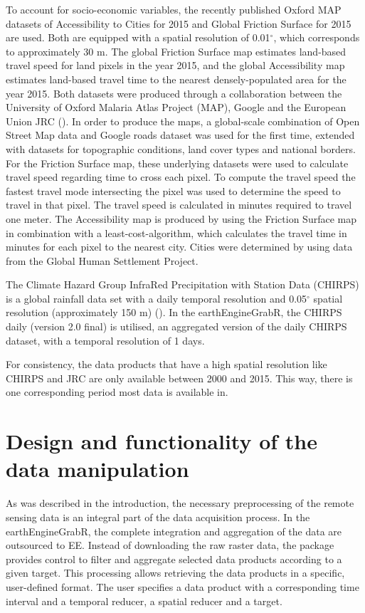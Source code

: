 To account for socio-economic variables, the recently published Oxford MAP datasets of Accessibility to Cities for 2015 and Global Friction Surface for 2015 are used. Both are equipped with a spatial resolution of 0.01$^\circ$, which corresponds to approximately 30 m. The global Friction Surface map estimates land-based travel speed for land pixels in the year 2015, and the global Accessibility map estimates land-based travel time to the nearest densely-populated area for the year 2015. Both datasets were produced through a collaboration between the University of Oxford Malaria Atlas Project (MAP), Google and the European Union JRC (\cite{weiss2018global}).
In order to produce the maps, a global-scale combination of Open Street Map data and Google roads dataset was used for the first time, extended with datasets for topographic conditions, land cover types and national borders.
For the Friction Surface map, these underlying datasets were used to calculate travel speed regarding time to cross each pixel. To compute the travel speed the fastest travel mode intersecting the pixel was used to determine the speed to travel in that pixel. The travel speed is calculated in minutes required to travel one meter. The Accessibility map is produced by using the Friction Surface map in combination with a least-cost-algorithm, which calculates the travel time in minutes for each pixel to the nearest city. Cities were determined by using data from the Global Human Settlement Project.  

The Climate Hazard Group InfraRed Precipitation with Station Data (CHIRPS) is a global rainfall data set with a daily temporal resolution and 0.05$^\circ$ spatial resolution (approximately 150 m) (\cite{funk2015climate}). In the earthEngineGrabR, the CHIRPS daily (version 2.0 final) is utilised, an aggregated version of the daily CHIRPS dataset, with a temporal resolution of 1 days.

For consistency, the data products that have a high spatial resolution like CHIRPS and JRC are only available between 2000 and 2015. This way, there is one corresponding period most data is available in.

\section{Design and functionality of the \\ data manipulation}

As was described in the introduction, the necessary preprocessing of the remote sensing data is an integral part of the data acquisition process. In the earthEngineGrabR, the complete integration and aggregation of the data are outsourced to EE.
Instead of downloading the raw raster data, the package provides control to filter and aggregate selected data products according to a given target. This processing allows retrieving the data products in a specific, user-defined format. The user specifies a data product with a corresponding time interval and a temporal reducer, a spatial reducer and a target. 

